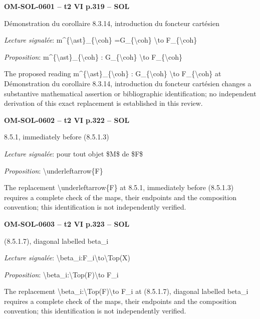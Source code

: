 \par\noindent\textbf{OM-SOL-0601 -- t2 VI p.319 -- SOL}\par
Démonstration du corollaire 8.3.14, introduction du foncteur cartésien\par
\emph{Lecture signalée}: m\textasciicircum{}\{\textbackslash{}ast\}\_\{\textbackslash{}coh\} =\allowbreak  G\_\{\textbackslash{}coh\} \textbackslash{}to F\_\{\textbackslash{}coh\}\par
\emph{Proposition}: m\textasciicircum{}\{\textbackslash{}ast\}\_\{\textbackslash{}coh\} : G\_\{\textbackslash{}coh\} \textbackslash{}to F\_\{\textbackslash{}coh\}\par
The proposed reading m\textasciicircum{}\{\textbackslash{}ast\}\_\{\textbackslash{}coh\} : G\_\{\textbackslash{}coh\} \textbackslash{}to F\_\{\textbackslash{}coh\} at Démonstration du corollaire 8.3.14, introduction du foncteur cartésien changes a substantive mathematical assertion or bibliographic identification; no independent derivation of this exact replacement is established in this review.\par
\par\noindent\textbf{OM-SOL-0602 -- t2 VI p.322 -- SOL}\par
8.5.1, immediately before (8.5.1.3)\par
\emph{Lecture signalée}: pour tout objet \$M\$ de \$F\$\par
\emph{Proposition}: \textbackslash{}underleftarrow\{F\}\par
The replacement \textbackslash{}underleftarrow\{F\} at 8.5.1, immediately before (8.5.1.3) requires a complete check of the maps, their endpoints and the composition convention; this identification is not independently verified.\par
\par\noindent\textbf{OM-SOL-0603 -- t2 VI p.323 -- SOL}\par
(8.5.1.7), diagonal labelled beta\_i\par
\emph{Lecture signalée}: \textbackslash{}beta\_i:F\_i\textbackslash{}to\textbackslash{}Top(X)\par
\emph{Proposition}: \textbackslash{}beta\_i:\textbackslash{}Top(F)\textbackslash{}to F\_i\par
The replacement \textbackslash{}beta\_i:\textbackslash{}Top(F)\textbackslash{}to F\_i at (8.5.1.7), diagonal labelled beta\_i requires a complete check of the maps, their endpoints and the composition convention; this identification is not independently verified.\par
